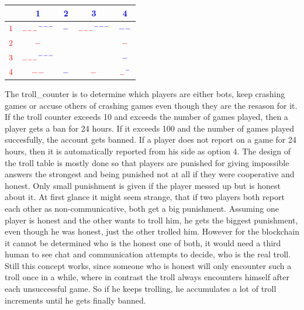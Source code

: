 \documentclass{article}
\begin{document}
\begin{center}
	\begin{tabular}{ c | c | c | c | c }
		& \textcolor{blue}{1} & \textcolor{blue}{2} & \textcolor{blue}{3} & \textcolor{blue}{4} \\ \hline
		$\textcolor{red}{1}$ & $\textcolor{red}{{}_{---}} \textcolor{blue}{{}^{---}} $ & $\textcolor{blue}{-} $ & $\textcolor{red}{{}_{---}} \textcolor{blue}{{}^{---}}$ & $\textcolor{blue}{--}$ \\ \hline
		$\textcolor{red}{2}$ & $\textcolor{red}{-}$ &  &  & $\textcolor{red}{-}$ \\ \hline
		$\textcolor{red}{3}$ & $\textcolor{red}{{}_{---}} \textcolor{blue}{{}^{---}}$ &  &  & $ \textcolor{blue}{-}$ \\ \hline
		$\textcolor{red}{4}$ &  $\textcolor{red}{{--}}$  &  $\textcolor{blue}{-}$  & $\textcolor{red}{{-}}$ & $\textcolor{red}{{}_-} \textcolor{blue}{{}^-}$ \\ 
	\end{tabular}
\end{center}
%
The troll\_counter is to determine which players are either bots, keep crashing games or accuse others of crashing games even though they are the resason for it. If the troll counter exceeds 10 and exceeds the number of games played, then a player gets a ban for 24 hours. If it exceeds 100 and the number of games played succesfully, the account gets banned. If a player does not report on a game for 24 hours, then it is automatically reported from his side as option 4. The design of the troll table is mostly done so that players are punished for giving impossible answers the strongest and being punished not at all if they were cooperative and honest. Only small punishment is given if the player messed up but is honest about it. At first glance it might seem strange, that if two players both report each other as non-communicative, both get a big punishment. Assuming one player is honest and the other wants to troll him, he gets the biggest punishment, even though he was honest, just the other trolled him. However for the blockchain it cannot be determined who is the honest one of both, it would need a third human to see chat and communication attempts to decide, who is the real troll. Still this concept works, since someone who is honest will only encounter such a troll once in a while, where in contrast  the troll always encounters himself after each unsuccessful game. So if he keeps trolling, he accumulates a lot of troll increments until he gets finally banned.
%
\newline \newline
\end{document}
